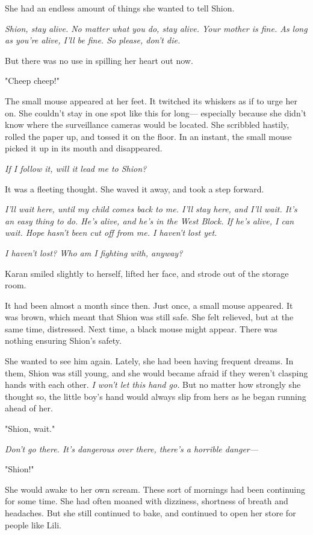 She had an endless amount of things she wanted to tell Shion.

\emph{Shion, stay alive. No matter what you do, stay alive. Your mother is
fine. As long as you're alive, I'll be fine. So please, don't die.}

But there was no use in spilling her heart out now.

"Cheep cheep!"

The small mouse appeared at her feet. It twitched its whiskers as if to
urge her on. She couldn't stay in one spot like this for long---
especially because she didn't know where the surveillance cameras would
be located. She scribbled hastily, rolled the paper up, and tossed it on
the floor. In an instant, the small mouse picked it up in its mouth and
disappeared.

\emph{If I follow it, will it lead me to Shion?}

It was a fleeting thought. She waved it away, and took a step forward.

\emph{I'll wait here, until my child comes back to me. I'll stay here, and
I'll wait. It's an easy thing to do. He's alive, and he's in the West
Block. If he's alive, I can wait. Hope hasn't been cut off from me. I
haven't lost yet.}

\emph{I haven't lost? Who am I fighting with, anyway?}

Karan smiled slightly to herself, lifted her face, and strode out of the
storage room.

It had been almost a month since then. Just once, a small mouse
appeared. It was brown, which meant that Shion was still safe. She felt
relieved, but at the same time, distressed. Next time, a black mouse
might appear. There was nothing ensuring Shion's safety.

She wanted to see him again. Lately, she had been having frequent
dreams. In them, Shion was still young, and she would became afraid if
they weren't clasping hands with each other. \emph{I won't let this hand go.}
But no matter how strongly she thought so, the little boy's hand would
always slip from hers as he began running ahead of her.

"Shion, wait."

\emph{Don't go there. It's dangerous over there, there's a horrible danger---}

"Shion!"

She would awake to her own scream. These sort of mornings had been
continuing for some time. She had often moaned with dizziness, shortness
of breath and headaches. But she still continued to bake, and continued
to open her store for people like Lili.

